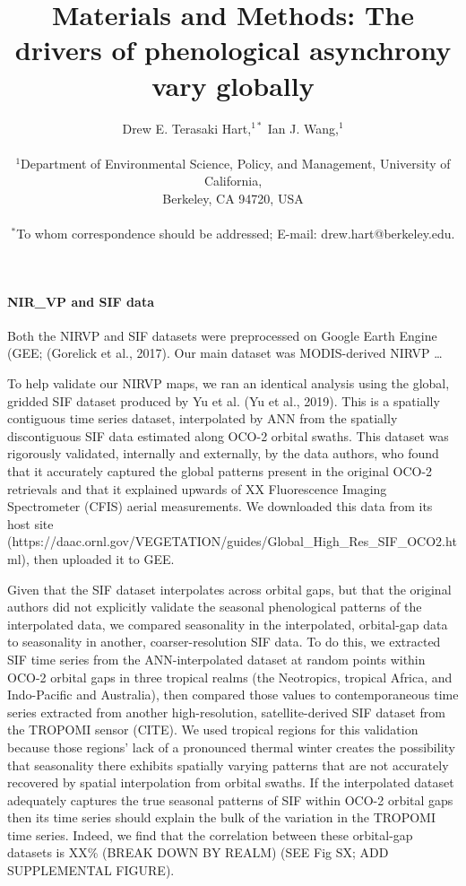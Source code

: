 \documentclass[12pt]{article}
\title{Materials and Methods: The drivers of phenological asynchrony vary globally}
\author
{Drew E. Terasaki Hart,$^{1\ast}$ Ian J. Wang,$^{1}$\\
\\
\normalsize{$^{1}$Department of Environmental Science, Policy, and Management, University of California,}\\
\normalsize{Berkeley, CA 94720, USA}\\
\\
\normalsize{$^\ast$To whom correspondence should be addressed; E-mail:  drew.hart@berkeley.edu.}
}
\date{}
\begin{document}
 


\baselineskip24pt


\maketitle 


\paragraph*{NIR_VP and SIF data}

Both the NIRVP and SIF datasets were preprocessed on Google Earth Engine
(GEE; (Gorelick et al., 2017). Our main dataset was MODIS-derived NIRVP …


To help validate our NIRVP maps, we ran an identical analysis using the
global, gridded SIF dataset produced by Yu et al. (Yu et al., 2019). This
is a spatially contiguous time series dataset, interpolated by ANN from
the spatially discontiguous SIF data estimated along OCO-2 orbital
swaths. This dataset was rigorously validated, internally and externally,
by the data authors, who found that it accurately captured the global
patterns present in the original OCO-2 retrievals and that it explained
upwards of XX%
Fluorescence Imaging Spectrometer (CFIS) aerial measurements. We
downloaded this data from its host site
(https://daac.ornl.gov/VEGETATION/guides/Global_High_Res_SIF_OCO2.html),
then uploaded it to GEE.

Given that the SIF dataset interpolates across orbital gaps, but that the
original authors did not explicitly validate the seasonal phenological
patterns of the interpolated data, we compared seasonality in the
interpolated, orbital-gap data to seasonality in another,
coarser-resolution SIF data. To do this, we extracted SIF time series
from the ANN-interpolated dataset at random points within OCO-2 orbital
gaps in three tropical realms (the Neotropics, tropical Africa, and
Indo-Pacific and Australia), then compared those values to
contemporaneous time series extracted from another high-resolution,
satellite-derived SIF dataset from the TROPOMI sensor (CITE). We used
tropical regions for this validation because those regions’ lack of a
pronounced thermal winter creates the possibility that seasonality there
exhibits spatially varying patterns that are not accurately recovered by
spatial interpolation from orbital swaths. If the interpolated dataset
adequately captures the true seasonal patterns of SIF within OCO-2
orbital gaps then its time series should explain the bulk of the
variation in the TROPOMI time series. Indeed, we find that the
correlation between these orbital-gap datasets is XX\% (BREAK DOWN BY
REALM) (SEE Fig SX; ADD SUPPLEMENTAL FIGURE).
\end{document}
